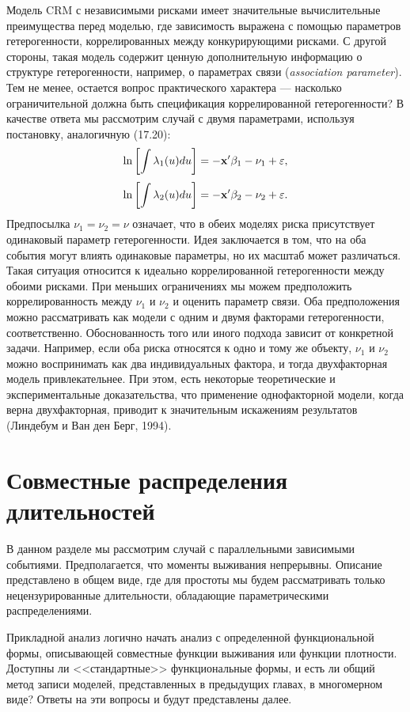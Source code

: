 \noindent
Модель CRM с независимыми рисками имеет значительные вычислительные преимущества перед моделью, где зависимость выражена с помощью параметров гетерогенности, коррелированных между конкурирующими рисками. С другой стороны, такая модель содержит ценную дополнительную информацию о структуре гетерогенности, например, о параметрах связи (\textit{association parameter}). Тем не менее, остается вопрос практического характера --- насколько ограничительной должна быть спецификация коррелированной гетерогенности? В качестве ответа мы рассмотрим случай с двумя параметрами, используя постановку, аналогичную (17.20): %
    $$\ln\left[ \int \lambda_1(u)du \right] = -\mathbf{x}'\beta_1 - \nu_1 + \varepsilon,$$
    $$\ln\left[ \int \lambda_2(u)du \right] = -\mathbf{x}'\beta_2 - \nu_2 + \varepsilon.$$
Предпосылка $\nu_1 = \nu_2 = \nu$ означает, что в обеих моделях риска присутствует одинаковый параметр гетерогенности. Идея заключается в том, что на оба события могут влиять одинаковые параметры, но их масштаб может различаться. Такая ситуация относится к идеально коррелированной гетерогенности между обоими рисками. При меньших ограничениях мы можем предположить коррелированность между $\nu_1$ и $\nu_2$ и оценить параметр связи. Оба предположения можно рассматривать как модели с одним и двумя факторами гетерогенности, соответственно. Обоснованность того или иного подхода зависит от конкретной задачи. Например, если оба риска относятся к одно и тому же объекту, $\nu_1$ и $\nu_2$ можно воспринимать как два индивидуальных фактора, и тогда двухфакторная модель привлекательнее. При этом, есть некоторые теоретические и экспериментальные доказательства, что применение однофакторной модели, когда верна двухфакторная, приводит к значительным искажениям результатов (Линдебум и Ван ден Берг, 1994).




\section{Совместные распределения длительностей}\label{sec:19.3}

\noindent
В данном разделе мы рассмотрим случай с параллельными зависимыми событиями. Предполагается, что моменты выживания непрерывны. Описание представлено в общем виде, где для простоты мы будем рассматривать только нецензурированные длительности, обладающие параметрическими распределениями.

Прикладной анализ логично начать анализ с определенной функциональной формы, описывающей совместные функции выживания или функции плотности. Доступны ли <<стандартные>> функциональные формы, и есть ли общий метод записи моделей, представленных в предыдущих главах, в многомерном виде? Ответы на эти вопросы и будут представлены далее.


